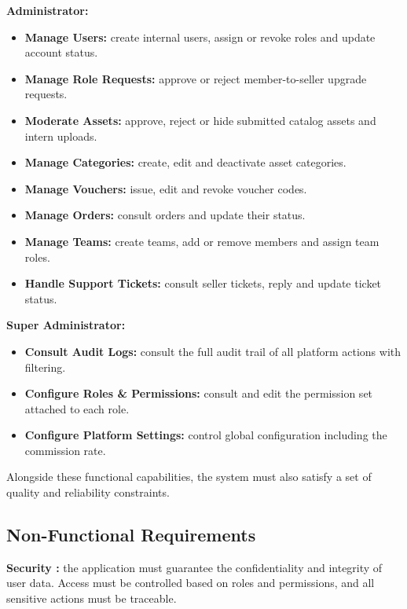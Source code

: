 \textbf{Administrator:}

\begin{itemize}[label=---,leftmargin=2em]
  \item \textbf{Manage Users:} create internal users, assign or revoke roles and update account status.
  \item \textbf{Manage Role Requests:} approve or reject member-to-seller upgrade requests.
  \item \textbf{Moderate Assets:} approve, reject or hide submitted catalog assets and intern uploads.
  \item \textbf{Manage Categories:} create, edit and deactivate asset categories.
  \item \textbf{Manage Vouchers:} issue, edit and revoke voucher codes.
  \item \textbf{Manage Orders:} consult orders and update their status.
  \item \textbf{Manage Teams:} create teams, add or remove members and assign team roles.
  \item \textbf{Handle Support Tickets:} consult seller tickets, reply and update ticket status.
\end{itemize}

\textbf{Super Administrator:}

\begin{itemize}[label=---,leftmargin=2em]
  \item \textbf{Consult Audit Logs:} consult the full audit trail of all platform actions with filtering.
  \item \textbf{Configure Roles \& Permissions:} consult and edit the permission set attached to each role.
  \item \textbf{Configure Platform Settings:} control global configuration including the commission rate.
\end{itemize}

Alongside these functional capabilities, the system must also satisfy a set of quality and reliability constraints.

\subsection{Non-Functional Requirements}

\textbf{Security :} the application must guarantee the confidentiality and integrity of user data. Access must be controlled based on roles and permissions, and all sensitive actions must be traceable.

